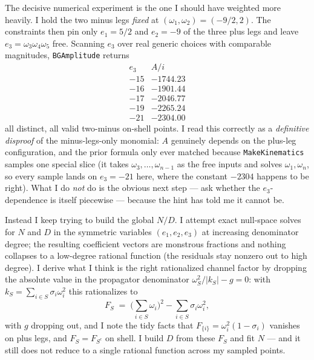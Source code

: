 \documentclass{article}
\begin{document}
The decisive numerical experiment is the one I should have weighted more heavily.
I hold the two minus legs \emph{fixed} at $(\omega_1,\omega_2)=(-9/2,2)$. The
constraints then pin only $e_1=5/2$ and $e_2=-9$ of the three plus legs and leave
$e_3=\omega_3\omega_4\omega_5$ free. Scanning $e_3$ over real generic choices with
comparable magnitudes, \texttt{BGAmplitude} returns
\[
\begin{array}{c|c}
e_3 & A/i\\\hline
-15 & -1744.23\\
-16 & -1901.44\\
-17 & -2046.77\\
-19 & -2265.24\\
-21 & -2304.00
\end{array}
\]
all distinct, all valid two-minus on-shell points. I read this correctly as a
\emph{definitive disproof} of the minus-legs-only monomial: $A$ genuinely depends
on the plus-leg configuration, and the prior formula only ever matched because
\texttt{MakeKinematics} samples one special slice (it takes
$\omega_3,\dots,\omega_{n-1}$ as the free inputs and solves $\omega_1,\omega_n$,
so every sample lands on $e_3=-21$ here, where the constant $-2304$ happens to be
right). What I do \emph{not} do is the obvious next step --- ask whether the
$e_3$-dependence is itself piecewise --- because the hint has told me it cannot be.

Instead I keep trying to build the global $N/D$. I attempt exact null-space solves
for $N$ and $D$ in the symmetric variables $(e_1,e_2,e_3)$ at increasing
denominator degree; the resulting coefficient vectors are monstrous fractions and
nothing collapses to a low-degree rational function (the residuals stay
nonzero out to high degree). I derive what I think is the right rationalized
channel factor by dropping the absolute value in the propagator denominator
$\omega_S^2/|k_S|-g=0$: with $k_S=\sum_{i\in S}\sigma_i\omega_i^2$ this rationalizes
to
\[
F_S \;=\; \Big(\sum_{i\in S}\omega_i\Big)^2-\sum_{i\in S}\sigma_i\omega_i^2,
\]
with $g$ dropping out, and I note the tidy facts that $F_{\{i\}}=\omega_i^2(1-\sigma_i)$
vanishes on plus legs, and $F_S=F_{S^c}$ on shell. I build $D$ from these $F_S$ and
fit $N$ --- and it still does not reduce to a single rational function across my
sampled points.
\end{document}
